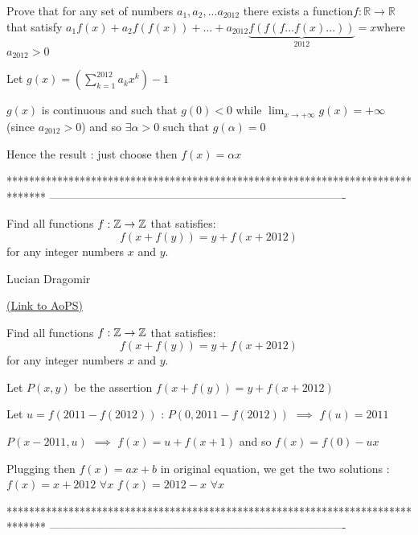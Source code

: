 \begin{solution}
	\begin{tcolorbox}Prove that for any set of numbers $a_1,a_2,...a_{2012}$ there exists a function$f: \mathbb{R}\to\mathbb{R}$that satisfy
$a_1f(x)+a_2f(f(x))+...+a_{2012}\underbrace{f(f(f...f(x)...))}_{2012}=x$where$ a_{2012}>0$\end{tcolorbox}
Let $g(x)=\left(\sum_{k=1}^{2012}a_kx^k\right)-1$

$g(x)$ is continuous and such that $g(0)<0$ while $\lim_{x\to+\infty}g(x)=+\infty$ (since $a_{2012}>0$) and so $\exists \alpha>0$ such that $g(\alpha)=0$

Hence the result : just choose then $f(x)=\alpha x$
\end{solution}
*******************************************************************************
-------------------------------------------------------------------------------

\begin{problem}
	Find all functions $ f: \Bbb{Z} \rightarrow \Bbb{Z} $ that satisfies:
\[ f(x+f(y))=y+f(x+2012) \]
for any integer numbers $ x $ and $ y $.

\begin{italicized}Lucian Dragomir\end{italicized}
	\flushright \href{https://artofproblemsolving.com/community/c6h474034}{(Link to AoPS)}
\end{problem}



\begin{solution}
	\begin{tcolorbox}Find all functions $ f: \Bbb{Z} \rightarrow \Bbb{Z} $ that satisfies:
\[ f(x+f(y))=y+f(x+2012) \]
for any integer numbers $ x $ and $ y $.\end{tcolorbox}
Let $P(x,y)$ be the assertion $f(x+f(y))=y+f(x+2012)$

Let $u=f(2011-f(2012))$ : $P(0,2011-f(2012))$ $\implies$ $f(u)=2011$

$P(x-2011,u)$ $\implies$ $f(x)=u+f(x+1)$ and so $f(x)=f(0)-ux$ 

Plugging then $f(x)=ax+b$ in original equation, we get the two solutions :
$f(x)=x+2012$ $\forall x$
$f(x)=2012-x$ $\forall x$
\end{solution}
*******************************************************************************
-------------------------------------------------------------------------------


